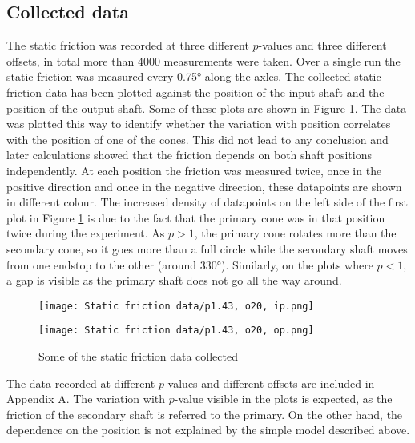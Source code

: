 \documentclass[12pt]{article}
\begin{document}
\subsection{Collected data}
The static friction was recorded at three different $p$-values and three different offsets, in total more than 4000 measurements were taken. Over a single run the static friction was measured every 0.75° along the axles. The collected static friction data has been plotted against the position of the input shaft and the position of the output shaft. Some of these plots are shown in Figure \ref{fig:staticFrictionData}. The data was plotted this way to identify whether the variation with position correlates with the position of one of the cones. This did not lead to any conclusion and later calculations showed that the friction depends on both shaft positions independently. At each position the friction was measured twice, once in the positive direction and once in the negative direction, these datapoints are shown in different colour. The increased density of datapoints on the left side of the first plot in Figure \ref{fig:staticFrictionData} is due to the fact that the primary cone was in that position twice during the experiment. As $p>1$, the primary cone rotates more than the secondary cone, so it goes more than a full circle while the secondary shaft moves from one endstop to the other (around 330°). Similarly, on the plots where $p<1$, a gap is visible as the primary shaft does not go all the way around.
 
\begin{figure}[!h]
\label{fig:staticFrictionData}
    \centering
    \begin{minipage}{0.49\textwidth}       
         \texttt{[image: Static friction data/p1.43, o20, ip.png]}
    \end{minipage}
    \begin{minipage}{0.49\textwidth}       
         \texttt{[image: Static friction data/p1.43, o20, op.png]}
    \end{minipage}
\caption{Some of the static friction data collected}
\end{figure}



The data recorded at different $p$-values and different offsets are included in Appendix A.
The variation with $p$-value visible in the plots is expected, as the friction of the secondary shaft is referred to the primary. On the other hand, the dependence on the position is not explained by the simple model described above.
\end{document}
